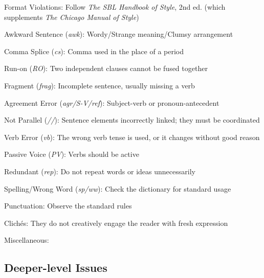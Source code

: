 \documentclass[11pt,twocolumn]{article}
\begin{document}
\begin{issues}

\item Format Violations: Follow \emph{The SBL Handbook of Style}, 2nd ed. (which supplements \emph{The Chicago Manual of Style})
\item Awkward Sentence (\emph{awk}): Wordy/Strange meaning/Clumsy arrangement
\item Comma Splice (\emph{cs}): Comma used in the place of a period
\item Run-on (\emph{RO}): Two independent clauses cannot be fused together
\item Fragment (\emph{frag}): Incomplete sentence, usually missing a verb
\item Agreement Error (\emph{agr/S-V/ref}): Subject-verb or pronoun-antecedent
\item Not Parallel (\emph{//}): Sentence elements incorrectly linked; they must be coordinated
\item Verb Error (\emph{vb}): The wrong verb tense is used, or it changes without good reason
\item Passive Voice (\emph{PV}): Verbs should be active
\item Redundant (\emph{rep}): Do not repeat words or ideas unnecessarily
\item Spelling/Wrong Word (\emph{sp/ww}): Check the dictionary for standard usage
\item Punctuation: Observe the standard rules
\item Clichés: They do not creatively engage the reader with fresh expression
\item Miscellaneous:

\end{issues}

\subsection*{Deeper-level Issues}
\end{document}
